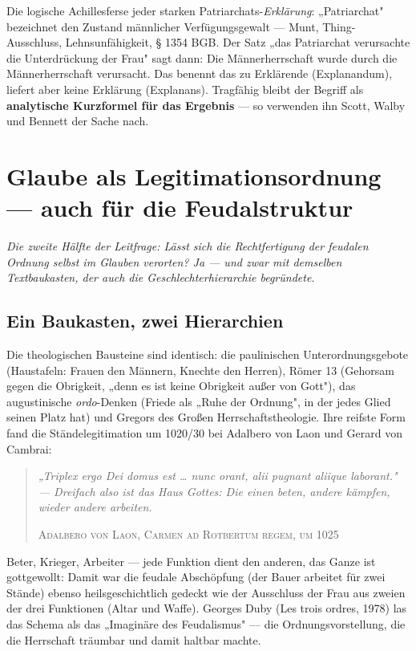 \documentclass[11pt,a4paper,ngerman]{scrartcl}
\newcommand{\chipbase}[2]{\hspace{0pt}{\footnotesize\textcolor{#1}{[\textsc{#2}]}}}
\newcommand{\chipbelegt}[1]{\chipbase{chipgreen}{#1}}
\newcommand{\chipplausibel}[1]{\chipbase{chipamber}{#1}}
\newenvironment{callout}[2]{%
  \def\FrameCommand{{\color{#1}\vrule width 2pt}\hspace{8pt}}%
  \MakeFramed{\advance\hsize-\width\FrameRestore}%
  \noindent{\small\scshape\color{#1}#2}\par\smallskip\small
}{\endMakeFramed\medskip}
\begin{document}
\begin{callout}{oxblood}{Der Zirkularitätseinwand}
Die logische Achillesferse jeder starken Patriarchats-\emph{Erklärung}: „Patriarchat" bezeichnet den Zustand männlicher Verfügungsgewalt — Munt, Thing-Ausschluss, Lehnsunfähigkeit, § 1354 BGB. Der Satz „das Patriarchat verursachte die Unterdrückung der Frau" sagt dann: Die Männerherrschaft wurde durch die Männerherrschaft verursacht. Das benennt das zu Erklärende (Explanandum), liefert aber keine Erklärung (Explanans). Tragfähig bleibt der Begriff als \textbf{analytische Kurzformel für das Ergebnis} — so verwenden ihn Scott, Walby und Bennett der Sache nach. \chipplausibel{plausibel}
\end{callout}


\section{Glaube als Legitimationsordnung — auch für die Feudalstruktur}

\noindent\textit{Die zweite Hälfte der Leitfrage: Lässt sich die Rechtfertigung der feudalen Ordnung selbst im Glauben verorten? Ja — und zwar mit demselben Textbaukasten, der auch die Geschlechterhierarchie begründete.}
\medskip

\subsection*{Ein Baukasten, zwei Hierarchien}

Die theologischen Bausteine sind identisch: die paulinischen Unterordnungsgebote (Haustafeln: Frauen den Männern, Knechte den Herren), Römer 13 (Gehorsam gegen die Obrigkeit, „denn es ist keine Obrigkeit außer von Gott"), das augustinische \emph{ordo}-Denken (Friede als „Ruhe der Ordnung", in der jedes Glied seinen Platz hat) und Gregors des Großen Herrschaftstheologie. Ihre reifste Form fand die Ständelegitimation um 1020/30 bei Adalbero von Laon und Gerard von Cambrai:

\begin{quotation}\small\itshape
„Triplex ergo Dei domus est … nunc orant, alii pugnant aliique laborant." — Dreifach also ist das Haus Gottes: Die einen beten, andere kämpfen, wieder andere arbeiten.
\par\nopagebreak\smallskip\hfill{\footnotesize\upshape\textsc{Adalbero von Laon, Carmen ad Rotbertum regem, um 1025}}
\end{quotation}

Beter, Krieger, Arbeiter — jede Funktion dient den anderen, das Ganze ist gottgewollt: Damit war die feudale Abschöpfung (der Bauer arbeitet für zwei Stände) ebenso heilsgeschichtlich gedeckt wie der Ausschluss der Frau aus zweien der drei Funktionen (Altar und Waffe). Georges Duby (Les trois ordres, 1978) las das Schema als das „Imaginäre des Feudalismus" — die Ordnungsvorstellung, die die Herrschaft träumbar und damit haltbar machte. \chipbelegt{belegt}
\end{document}
